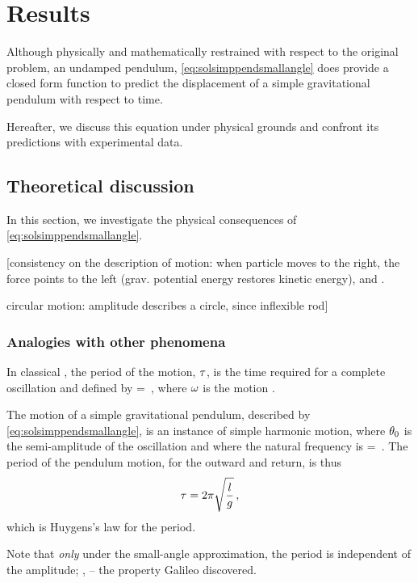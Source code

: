 \section{Results}
Although physically and mathematically restrained with respect to the original problem, an undamped pendulum,  \cref{eq:solsimppendsmallangle} does provide a closed form function to predict the displacement of a simple gravitational pendulum with respect to time. 

Hereafter, we discuss this equation under physical grounds and confront its predictions with experimental data.


\subsection{Theoretical discussion}
In this section, we investigate the physical consequences of \cref{eq:solsimppendsmallangle}.

[consistency on the description of motion: when particle moves to the right, the force points to the left (grav. potential energy restores kinetic energy), and \vis.

circular motion: amplitude describes a circle, since inflexible rod]


\subsubsection{Analogies with other phenomena}\label{subsec:analogieswithotherphenomena}
In classical , the period of the motion, $\tau$, is the time required for a complete oscillation and defined by
\beq
\oscper = \dfrac{2\pi}{\natfreq}\,,
\eeq
where $\omega$ is the motion .

The motion of a simple gravitational pendulum, described by \cref{eq:solsimppendsmallangle}, is an instance of simple harmonic motion, where $\theta_0$ is the semi-amplitude of the oscillation and where the natural frequency is
\beq
\natfreq = \sqrt{\dfrac{\grav}{\length}}\,.
\eeq
The period of the pendulum motion, for the outward and return, is thus
\begin{equation}\label{eq:simplependulumperiod}
\tau = 2\pi\sqrt{\dfrac{l}{g}}\,,
\end{equation}
which is Huygens's law for the period.

Note that \emph{only} under the small-angle approximation, the period is independent of the amplitude; \ie,  -- the property Galileo discovered.


